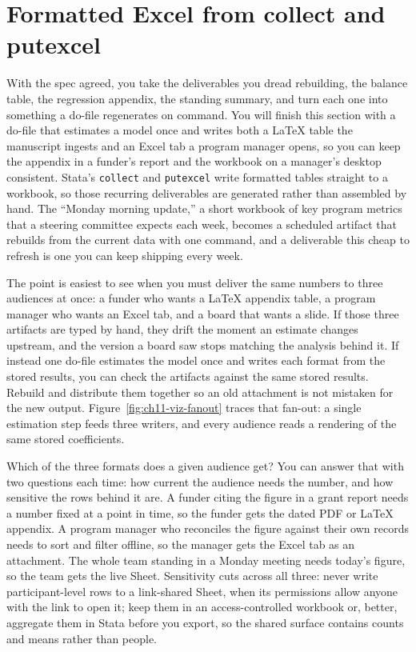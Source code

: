 \documentclass[
    a4paper,
    fontsize=10pt,
    twoside=true,
    numbers=noenddot,
]{kaobook}
\begin{document}
\section{Formatted Excel from collect and putexcel}
With the spec agreed, you take the deliverables you dread rebuilding, the balance table, the regression appendix, the standing summary, and turn each one into something a do-file regenerates on command. You will finish this section with a do-file that estimates a model once and writes both a \LaTeX{} table the manuscript ingests and an Excel tab a program manager opens, so you can keep the appendix in a funder's report and the workbook on a manager's desktop consistent. Stata's \texttt{collect} and \texttt{putexcel} write formatted tables straight to a workbook, so those recurring deliverables are generated rather than assembled by hand. The \enquote{Monday morning update,} a short workbook of key program metrics that a steering committee expects each week, becomes a scheduled artifact that rebuilds from the current data with one command, and a deliverable this cheap to refresh is one you can keep shipping every week.

The point is easiest to see when you must deliver the same numbers to three audiences at once: a funder who wants a \LaTeX{} appendix table, a program manager who wants an Excel tab, and a board that wants a slide. If those three artifacts are typed by hand, they drift the moment an estimate changes upstream, and the version a board saw stops matching the analysis behind it. If instead one do-file estimates the model once and writes each format from the stored results, you can check the artifacts against the same stored results. Rebuild and distribute them together so an old attachment is not mistaken for the new output. Figure~\ref{fig:ch11-viz-fanout} traces that fan-out: a single estimation step feeds three writers, and every audience reads a rendering of the same stored coefficients.

Which of the three formats does a given audience get? You can answer that with two questions each time: how current the audience needs the number, and how sensitive the rows behind it are. A funder citing the figure in a grant report needs a number fixed at a point in time, so the funder gets the dated PDF or \LaTeX{} appendix. A program manager who reconciles the figure against their own records needs to sort and filter offline, so the manager gets the Excel tab as an attachment. The whole team standing in a Monday meeting needs today's figure, so the team gets the live Sheet. Sensitivity cuts across all three: never write participant-level rows to a link-shared Sheet, when its permissions allow anyone with the link to open it; keep them in an access-controlled workbook or, better, aggregate them in Stata before you export, so the shared surface contains counts and means rather than people.
\end{document}
